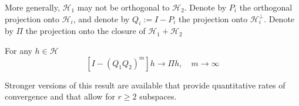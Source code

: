 More generally, $\mathcal{H}_1$ may not be orthogonal to $\mathcal{H}_2$. Denote by $P_i$ the orthogonal projection onto $\mathcal{H}_i$, and denote by $Q_i:=I-P_i$ the projection onto $\mathcal{H}_i^{\perp}$. Denote by $\Pi$ the projection onto the closure of $\mathcal{H}_1+\mathcal{H}_2$

\begin{lemma}
For any $h\in\mathcal{H}$
$$
[I-(Q_1Q_2)^m]h\rightarrow \Pi h,\quad m\rightarrow\infty
$$
\end{lemma}

Stronger versions of this result are available that provide quantitative rates of convergence and that allow for $r\geq 2$ subspaces.